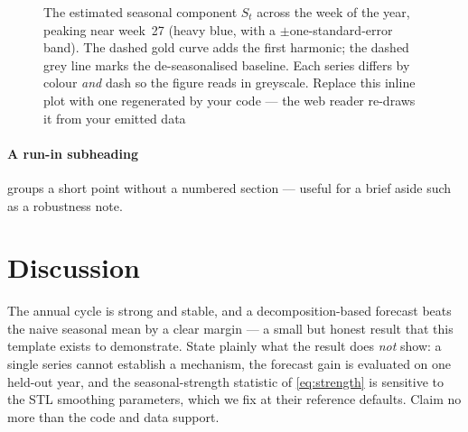\documentclass[11pt]{artaquest}   %
\begin{document}
\begin{figure}[t]
  \centering
  \caption{The estimated seasonal component $S_t$ across the week of the year, peaking near
    week~\num{27} (heavy blue, with a $\pm$one-standard-error band). The dashed gold curve adds
    the first harmonic; the dashed grey line marks the de-seasonalised baseline. Each series
    differs by colour \emph{and} dash so the figure reads in greyscale. Replace this inline plot
    with one regenerated by your code --- the web reader re-draws it from your emitted data}
  \label{fig:decomp}
\end{figure}

\paragraph{A run-in subheading} groups a short point without a numbered section --- useful
for a brief aside such as a robustness note.

\section{Discussion}
The annual cycle is strong and stable, and a decomposition-based forecast beats the naive
seasonal mean by a clear margin --- a small but honest result that this template exists to
demonstrate. State plainly what the result does \emph{not} show: a single series cannot
establish a mechanism, the forecast gain is evaluated on one held-out year, and the
seasonal-strength statistic of \cref{eq:strength} is sensitive to the STL smoothing
parameters, which we fix at their reference defaults. Claim no more than the code and data
support.
\end{document}
